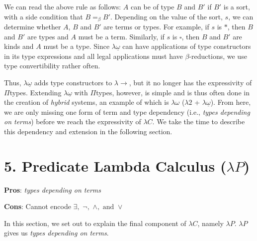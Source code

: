 \documentclass[9pt,preprint,nocopyrightspace,computermodern]{sigplanconf} %
\begin{document}
We can read the above rule as follows: \(A\) can be of type \(B\) and \(B'\) if
\(B'\) is a sort, with a side condition that \(B =_\beta B'\). Depending on the value
of the sort, \(s\), we can determine whether \(A\), \(B\) and \(B'\) are terms or types.
For example, if \(s\) is \(*\), then \(B\) and \(B'\) are types and \(A\) must be a term.
Similarly, if \(s\) is \(\square\), then \(B\) and \(B'\) are kinds and \(A\)  must be a type.
Since \(\lambda\underline\omega\) can have applications of type constructors in its
type expressions and all legal applications must have \(\beta\)-reductions, we use
type convertibility rather often.

Thus, \(\lambda\underline\omega\) adds type constructors to \(\lambda\!\!\rightarrow\),
but it no longer has the expressivity of \(\Pi\)types. Extending \(\lambda\underline\omega\)
with \(\Pi\)types, however, is simple and is thus often done in the creation of
\textit{hybrid} systems, an example of which is \(\lambda\omega\) (\(\lambda 2\) +
\(\lambda\underline\omega\)). From here, we are only missing one form of term
and type dependency (i.e., \textit{types depending on terms}) before we reach the
expressivity of \(\lambda C\). We take the time to describe this dependency and
extension in the following section.


\section*{5. Predicate Lambda Calculus (\(\lambda P\))}
\begin{flushleft}
  \textbf{Pros}: \textit{types depending on terms}
  \par  
  \textbf{Cons}: Cannot encode \(\exists,\,\,\neg,\,\,\wedge,\,\, \text{and} \,\, \vee\)
\end{flushleft}
In this section, we set out to explain the final component of \(\lambda C\), namely
\(\lambda P\). \(\lambda P\) gives us \textit{types depending on terms}.
\end{document}
